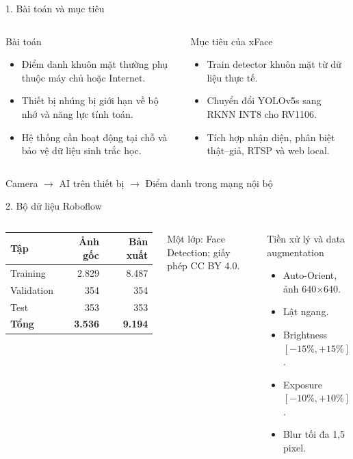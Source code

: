 \documentclass[aspectratio=169,11pt]{beamer}
\begin{document}
\begin{frame}{1. Bài toán và mục tiêu}
\begin{columns}[T,onlytextwidth]
  \begin{block}{Bài toán}
  \begin{itemize}
    \item Điểm danh khuôn mặt thường phụ thuộc máy chủ hoặc Internet.
    \item Thiết bị nhúng bị giới hạn về bộ nhớ và năng lực tính toán.
    \item Hệ thống cần hoạt động tại chỗ và bảo vệ dữ liệu sinh trắc học.
  \end{itemize}
  \end{block}
  \begin{block}{Mục tiêu của xFace}
  \begin{itemize}
    \item Train detector khuôn mặt từ dữ liệu thực tế.
    \item Chuyển đổi YOLOv5s sang RKNN INT8 cho RV1106.
    \item Tích hợp nhận diện, phân biệt thật--giả, RTSP và web local.
  \end{itemize}
  \end{block}
\end{columns}
\vspace{0.8em}
\centering
\color{xfaceDark}\large Camera $\rightarrow$ AI trên thiết bị $\rightarrow$ Điểm danh trong mạng nội bộ
\end{frame}

\begin{frame}{2. Bộ dữ liệu Roboflow}
\begin{columns}[T,onlytextwidth]
  \centering
  \begin{tabular}{lrr}
    \toprule
    \textbf{Tập} & \textbf{Ảnh gốc} & \textbf{Bản xuất} \\
    \midrule
    Training & 2.829 & 8.487 \\
    Validation & 354 & 354 \\
    Test & 353 & 353 \\
    \midrule
    \textbf{Tổng} & \textbf{3.536} & \textbf{9.194} \\
    \bottomrule
  \end{tabular}
  \vspace{0.8em}

  \small Một lớp: Face Detection; giấy phép CC BY 4.0.
  \begin{block}{Tiền xử lý và data augmentation}
  \begin{itemize}
    \item Auto-Orient, ảnh 640$\times$640.
    \item Lật ngang.
    \item Brightness $[-15\%,+15\%]$.
    \item Exposure $[-10\%,+10\%]$.
    \item Blur tối đa 1,5 pixel.
  \end{itemize}
  \end{block}
\end{columns}
\end{frame}
\end{document}

